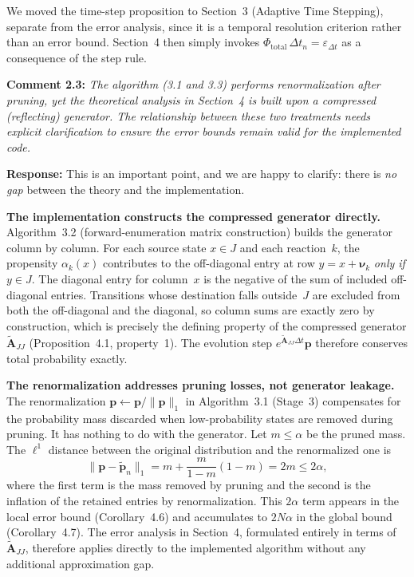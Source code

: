 \documentclass[11pt]{article}
\begin{document}
We moved the time-step proposition to Section~3 (Adaptive Time Stepping), separate from the error analysis, since it is a temporal resolution criterion rather than an error bound. Section~4 then simply invokes $\Phi_{\mathrm{total}}\,\Delta t_n = \varepsilon_{\Delta t}$ as a consequence of the step rule.

\medskip

\noindent\textbf{Comment 2.3:} \textit{The algorithm (3.1 and 3.3) performs
renormalization after pruning, yet the theoretical analysis in Section~4 is
built upon a compressed (reflecting) generator. The relationship between these
two treatments needs explicit clarification to ensure the error bounds remain
valid for the implemented code.}

\textbf{Response:} This is an important point, and we are happy to clarify:
there is \emph{no gap} between the theory and the implementation.

\textbf{The implementation constructs the compressed generator directly.}
Algorithm~3.2 (forward-enumeration matrix construction) builds the generator column by column. For each source state $x \in J$ and each reaction~$k$, the propensity $\alpha_k(x)$ contributes to the off-diagonal entry at row $y = x + \boldsymbol{\nu}_k$ \emph{only if} $y \in J$. The diagonal entry for column~$x$ is the negative of the sum of included off-diagonal entries. Transitions whose destination falls outside~$J$ are excluded from both the off-diagonal and the diagonal, so column sums are exactly zero by construction, which is precisely the defining property of the compressed generator $\widetilde{\mathbf{A}}_{JJ}$ (Proposition~4.1, property~1). The evolution step $e^{\widetilde{\mathbf{A}}_{JJ}\Delta t}\boldsymbol{p}$ therefore conserves total probability exactly.

\textbf{The renormalization addresses pruning losses, not generator leakage.}
The renormalization $\boldsymbol{p} \gets \boldsymbol{p}/\|\boldsymbol{p}\|_1$ in Algorithm~3.1 (Stage~3) compensates for the probability mass discarded when low-probability states are removed during pruning. It has nothing to do with the generator. Let $m \leq \alpha$ be the pruned mass. The $\ell^1$ distance between the original distribution and the renormalized one is
\[
\|\boldsymbol{p} - \widetilde{\boldsymbol{p}}_n\|_1 = m + \frac{m}{1-m}(1-m) = 2m \leq 2\alpha,
\]
where the first term is the mass removed by pruning and the second is the inflation of the retained entries by renormalization. This $2\alpha$ term appears in the local error bound (Corollary~4.6) and accumulates to $2N\alpha$ in the global bound (Corollary~4.7). The error analysis in Section~4, formulated entirely in terms of $\widetilde{\mathbf{A}}_{JJ}$, therefore applies directly to the implemented algorithm without any additional approximation gap.
\end{document}
